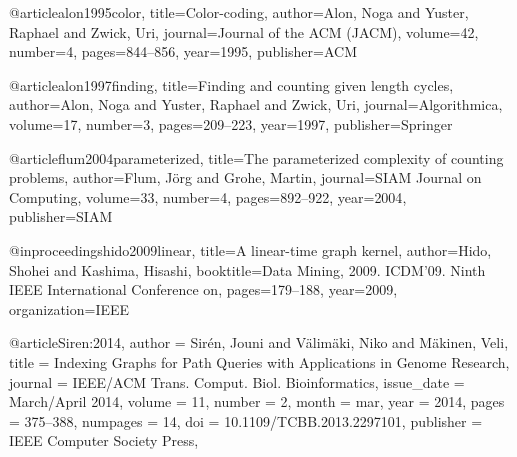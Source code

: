 @article{alon1995color,
  title={Color-coding},
  author={Alon, Noga and Yuster, Raphael and Zwick, Uri},
  journal={Journal of the ACM (JACM)},
  volume={42},
  number={4},
  pages={844--856},
  year={1995},
  publisher={ACM}
}

@article{alon1997finding,
  title={Finding and counting given length cycles},
  author={Alon, Noga and Yuster, Raphael and Zwick, Uri},
  journal={Algorithmica},
  volume={17},
  number={3},
  pages={209--223},
  year={1997},
  publisher={Springer}
}

@article{flum2004parameterized,
  title={The parameterized complexity of counting problems},
  author={Flum, J{\"o}rg and Grohe, Martin},
  journal={SIAM Journal on Computing},
  volume={33},
  number={4},
  pages={892--922},
  year={2004},
  publisher={SIAM}
}

@inproceedings{hido2009linear,
  title={A linear-time graph kernel},
  author={Hido, Shohei and Kashima, Hisashi},
  booktitle={Data Mining, 2009. ICDM'09. Ninth IEEE International Conference on},
  pages={179--188},
  year={2009},
  organization={IEEE}
}

@article{Siren:2014,
 author = {Sir{\'e}n, Jouni and V\"{a}lim\"{a}ki, Niko and M\"{a}kinen, Veli},
 title = {Indexing Graphs for Path Queries with Applications in Genome Research},
 journal = {IEEE/ACM Trans. Comput. Biol. Bioinformatics},
 issue_date = {March/April 2014},
 volume = {11},
 number = {2},
 month = mar,
 year = {2014},
 pages = {375--388},
 numpages = {14},
 doi = {10.1109/TCBB.2013.2297101},
 publisher = {IEEE Computer Society Press},
}  
